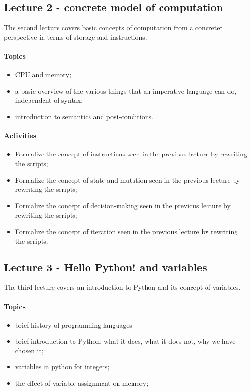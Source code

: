 			\subsection{Lecture 2 - concrete model of computation}
				The second lecture covers basic concepts of computation from a concreter perspective in terms of storage and instructions.

				\paragraph*{Topics}
					\begin{itemize}
						\item CPU and memory;
						\item a basic overview of the various things that an imperative language can do, independent of syntax;
						\item introduction to semantics and post-conditions.
					\end{itemize}

				\paragraph*{Activities}
					\begin{itemize}
						\item Formalize the concept of instructions seen in the previous lecture by rewriting the scripts;
						\item Formalize the concept of state and mutation seen in the previous lecture by rewriting the scripts;
						\item Formalize the concept of decision-making seen in the previous lecture by rewriting the scripts;
						\item Formalize the concept of iteration seen in the previous lecture by rewriting the scripts.
					\end{itemize}


			\subsection{Lecture 3 - Hello Python! and variables}
				The third lecture covers an introduction to Python and its concept of variables.

				\paragraph*{Topics}
					\begin{itemize}
						\item brief history of programming languages;
						\item brief introduction to Python: what it does, what it does not, why we have chosen it;
						\item variables in python for integers;
						\item the effect of variable assignment on memory;
					\end{itemize}

